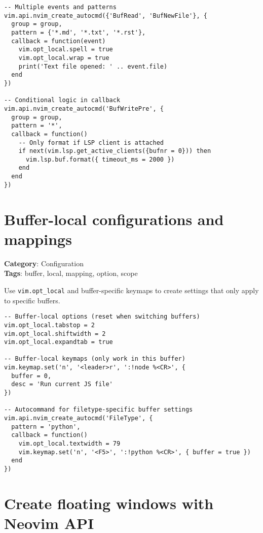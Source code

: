 {{{{{{\begin{Exa*}{}
\begin{Verbatim}[fontsize=\footnotesize, breaklines, breakanywhere]
-- Multiple events and patterns
vim.api.nvim_create_autocmd({'BufRead', 'BufNewFile'}, {
  group = group,
  pattern = {'*.md', '*.txt', '*.rst'},
  callback = function(event)
    vim.opt_local.spell = true
    vim.opt_local.wrap = true
    print('Text file opened: ' .. event.file)
  end
})

-- Conditional logic in callback
vim.api.nvim_create_autocmd('BufWritePre', {
  group = group,
  pattern = '*',
  callback = function()
    -- Only format if LSP client is attached
    if next(vim.lsp.get_active_clients({bufnr = 0})) then
      vim.lsp.buf.format({ timeout_ms = 2000 })
    end
  end
})
\end{Verbatim}
\end{Exa*}

\section{Buffer-local configurations and mappings}

\textbf{Category}: Configuration\\ \textbf{Tags}: buffer, local, mapping, option, scope
\vspace{0.5cm}

Use {\footnotesize \Verb§vim.opt_local§} and buffer-specific keymaps to create settings that only apply to specific buffers.

\begin{Exa*}{}
\begin{Verbatim}[fontsize=\footnotesize, breaklines, breakanywhere]
-- Buffer-local options (reset when switching buffers)
vim.opt_local.tabstop = 2
vim.opt_local.shiftwidth = 2
vim.opt_local.expandtab = true

-- Buffer-local keymaps (only work in this buffer)
vim.keymap.set('n', '<leader>r', ':!node %<CR>', {
  buffer = 0,
  desc = 'Run current JS file'
})

-- Autocommand for filetype-specific buffer settings
vim.api.nvim_create_autocmd('FileType', {
  pattern = 'python',
  callback = function()
    vim.opt_local.textwidth = 79
    vim.keymap.set('n', '<F5>', ':!python %<CR>', { buffer = true })
  end
})
\end{Verbatim}
\end{Exa*}

\section{Create floating windows with Neovim API}

}}}}}}

